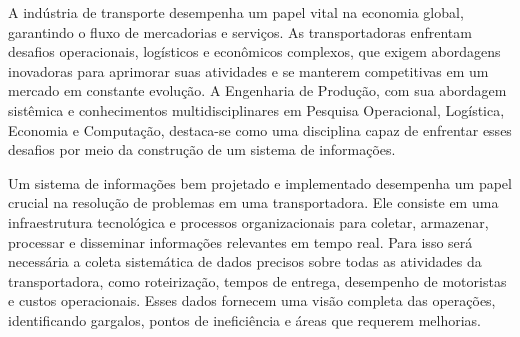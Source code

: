 A indústria de transporte desempenha um papel vital na economia global, garantindo o fluxo de mercadorias e serviços. As transportadoras enfrentam desafios operacionais, logísticos e econômicos complexos, que exigem abordagens inovadoras para aprimorar suas atividades e se manterem competitivas em um mercado em constante evolução. A Engenharia de Produção, com sua abordagem sistêmica e conhecimentos multidisciplinares em Pesquisa Operacional, Logística, Economia e Computação, destaca-se como uma disciplina capaz de enfrentar esses desafios por meio da construção de um sistema de informações.

Um sistema de informações bem projetado e implementado desempenha um papel crucial na resolução de problemas em uma transportadora. Ele consiste em uma infraestrutura tecnológica e processos organizacionais para coletar, armazenar, processar e disseminar informações relevantes em tempo real. Para isso será necessária a coleta sistemática de dados precisos sobre todas as atividades da transportadora, como roteirização, tempos de entrega, desempenho de motoristas e custos operacionais. Esses dados fornecem uma visão completa das operações, identificando gargalos, pontos de ineficiência e áreas que requerem melhorias.